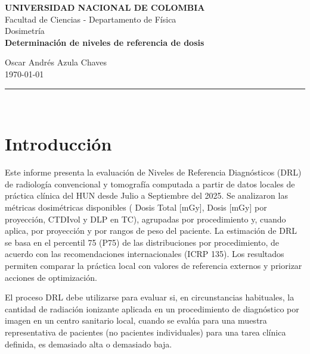 \documentclass{article}
\numberwithin{equation}{section}
\numberwithin{figure}{section}
\numberwithin{table}{section}
\begin{document}
\begin{center}
    \textbf{UNIVERSIDAD NACIONAL DE COLOMBIA} \\
    \vspace{0.2cm}
    \small{Facultad de Ciencias - Departamento de Física} \\
    \vspace{0.2cm}
    \small{Dosimetría} \\
    \vspace{0.5cm}
    \large{\textbf{Determinación de niveles de referencia de dosis}} \\
    \vspace{0.2cm}
    
    \vspace{0.5cm}
    \small{Oscar Andrés Azula Chaves } \\
    \vspace{0.2cm}
    \small{\today} \\
    \vspace{0.5cm}
    \rule{\textwidth}{0.5pt} \\
    \vspace{1cm}
\end{center}







\section{Introducción}

Este informe presenta la evaluación de Niveles de Referencia Diagnósticos (DRL) de radiología convencional y tomografía computada a partir de datos locales de práctica clínica del HUN desde Julio a Septiembre del 2025. Se analizaron las métricas dosimétricas disponibles ( Dosis Total [mGy], Dosis [mGy] por proyección, CTDIvol y DLP en TC), agrupadas por procedimiento y, cuando aplica, por proyección y por rangos de peso del paciente. La estimación de DRL se basa en el percentil 75 (P75) de las distribuciones por procedimiento, de acuerdo con las recomendaciones internacionales (ICRP 135). Los resultados permiten comparar la práctica local con valores de referencia externos y priorizar acciones de optimización.

El proceso DRL debe utilizarse para evaluar si, en circunstancias habituales,
la cantidad de radiación ionizante aplicada en un procedimiento de diagnóstico por imagen en
un centro sanitario local, cuando se evalúa para una muestra representativa de pacientes (no
pacientes individuales) para una tarea clínica definida, es demasiado alta o demasiado baja.
\end{document}
